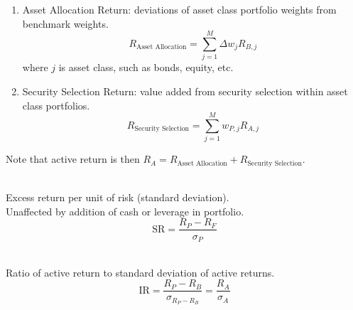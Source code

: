 \begin{remark} 
\begin{enumerate}[label=\roman*.]
\setlength{\itemsep}{0pt}
\item Asset Allocation Return: deviations of asset class portfolio weights from benchmark weights.
\begin{equation}
R_{\text{Asset Allocation}} = \sum\limits_{j=1}^M \Delta w_j R_{B,j} \nonumber
\end{equation}
where $j$ is asset class, such as bonds, equity, etc.
\item Security Selection Return: value added from security selection within asset class portfolios.
\begin{equation}
R_{\text{Security Selection}} = \sum\limits_{j=1}^M w_{P, j} R_{A, j} \nonumber
\end{equation}
\end{enumerate}
Note that active return is then $R_A = R_{\text{Asset Allocation}} + R_{\text{Security Selection}}$.
\end{remark}

\begin{definition} \\
Excess return per unit of risk (standard deviation).\\
Unaffected by addition of cash or leverage in portfolio.
\begin{equation}
\text{SR} = \frac{R_P - R_F}{\sigma_P} \nonumber
\end{equation}
\end{definition}

\begin{definition} \\
Ratio of active return to standard deviation of active returns.
\begin{equation}
\text{IR} = \frac{R_P - R_B}{\sigma_{R_P - R_B}} = \frac{R_A}{\sigma_A} \nonumber
\end{equation}
\end{definition}

